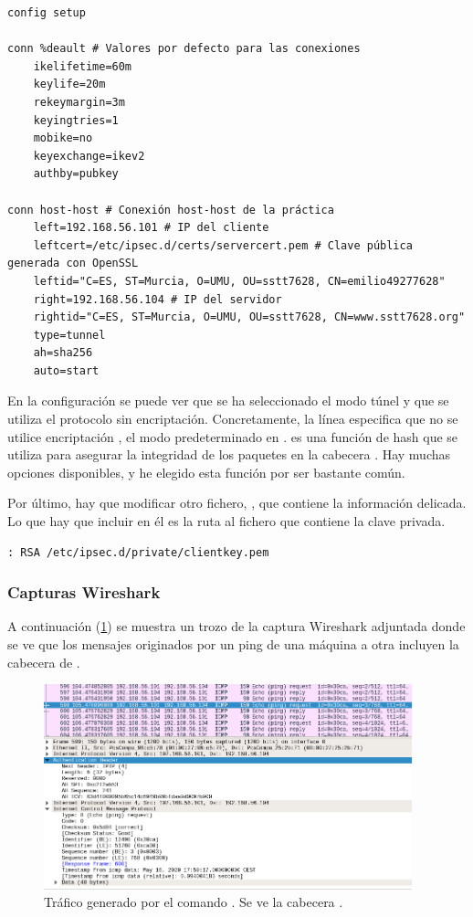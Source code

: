 \begin{lstlisting}[title=Fichero \file{/etc/ipsec.conf} del cliente]
config setup

conn %deault # Valores por defecto para las conexiones
	ikelifetime=60m
	keylife=20m
	rekeymargin=3m
	keyingtries=1
	mobike=no
	keyexchange=ikev2
	authby=pubkey

conn host-host # Conexión host-host de la práctica
	left=192.168.56.101 # IP del cliente
	leftcert=/etc/ipsec.d/certs/servercert.pem # Clave pública generada con OpenSSL
	leftid="C=ES, ST=Murcia, O=UMU, OU=sstt7628, CN=emilio49277628"
	right=192.168.56.104 # IP del servidor
	rightid="C=ES, ST=Murcia, O=UMU, OU=sstt7628, CN=www.sstt7628.org"
	type=tunnel
	ah=sha256
	auto=start
\end{lstlisting}

En la configuración se puede ver que se ha seleccionado el modo túnel y que se utiliza el protocolo sin encriptación. Concretamente, la línea  especifica que no se utilice encriptación , el modo predeterminado en .  es una función de hash que se utiliza para asegurar la integridad de los paquetes en la cabecera . Hay muchas opciones disponibles, y he elegido esta función por ser bastante común.

Por último, hay que modificar otro fichero, , que contiene la información delicada. Lo que hay que incluir en él es la ruta al fichero que contiene la clave privada.

\begin{lstlisting}[title=Fichero \file{/etc/ipsec.secrets} del cliente]
: RSA /etc/ipsec.d/private/clientkey.pem
\end{lstlisting}

\subsubsection{Capturas Wireshark}
A continuación (\cref{img-cap-ping}) se muestra un trozo de la captura Wireshark adjuntada donde se ve que los mensajes originados por un ping de una máquina a otra incluyen la cabecera  de {\IPsec}.

\begin{figure}[h]
    \centering
    \includegraphics[width=0.95\textwidth]{tests/capture-ping.png}
    \caption{Tráfico generado por el comando . Se ve la cabecera .}
    \label{img-cap-ping}
\end{figure}


